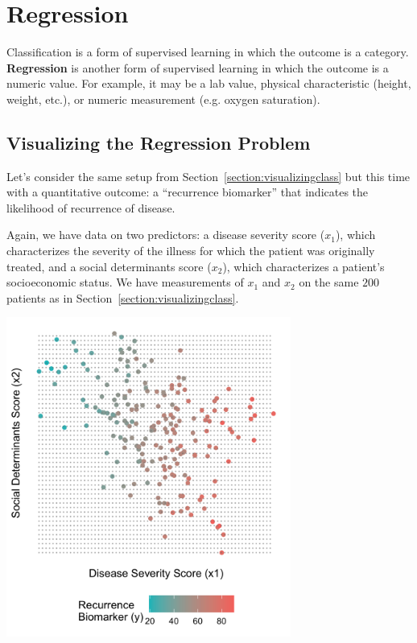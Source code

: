 \chapter{Regression \label{chapter:regression}}

Classification is a form of supervised learning in which the outcome is a category. \textbf{Regression} is another form of supervised learning in which the outcome is a numeric value. For example, it may be a lab value, physical characteristic (height, weight, etc.), or numeric measurement (e.g. oxygen saturation).


\section{Visualizing the Regression Problem \label{section:visualizingreg}}

Let's consider the same setup from Section~\ref{section:visualizingclass} but this time with a quantitative outcome: a ``recurrence biomarker'' that indicates the likelihood of recurrence of disease.

Again, we have data on two predictors: a disease severity score ($x_1$), which characterizes the severity of the illness for which the patient was originally treated, and a social determinants score ($x_2$), which characterizes a patient's socioeconomic status. We have measurements of $x_1$ and $x_2$ on the same $200$ patients as in Section~\ref{section:visualizingclass}. 

\begin{center}
\includegraphics[width=0.7\textwidth]{img/esl-reg-just-data.png}
\end{center}

